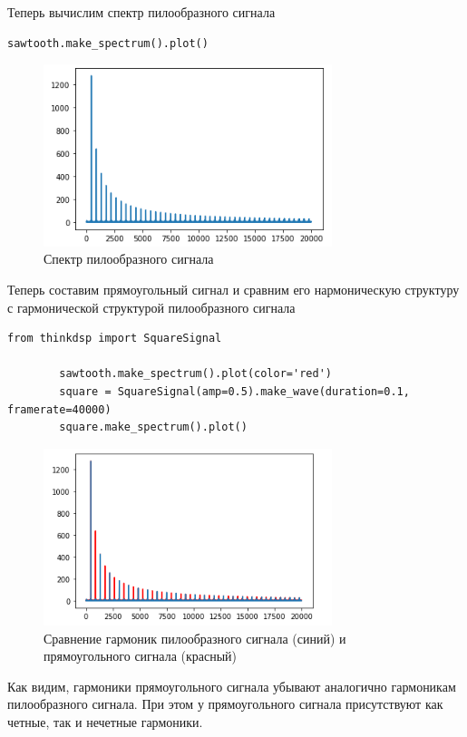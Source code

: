 \documentclass[a4paper,12pt]{article}
\begin{document}
\begin{enumerate}
	Теперь вычислим спектр пилообразного сигнала
	\begin{lstlisting}[caption=Спектр пилообразного сигнала]
		sawtooth.make_spectrum().plot()
	\end{lstlisting}
	\begin{figure}[H]
		\centering
		\includegraphics[width=0.75\textwidth]{2_2.png}
		\caption{Спектр пилообразного сигнала}
		\label{fig:2.2}
	\end{figure}
	
	
	Теперь составим прямоугольный сигнал и сравним его нармоническую структуру с гармонической структурой пилообразного сигнала
	\begin{lstlisting}[caption=Создание прямоугольного сигнала]
		from thinkdsp import SquareSignal
		
		sawtooth.make_spectrum().plot(color='red')
		square = SquareSignal(amp=0.5).make_wave(duration=0.1, framerate=40000)
		square.make_spectrum().plot()
	\end{lstlisting}
	\begin{figure}[H]
		\centering
		\includegraphics[width=0.75\textwidth]{2_3.png}
		\caption{Сравнение гармоник пилообразного сигнала (синий) и прямоугольного сигнала (красный)}
		\label{fig:2.3}
	\end{figure}
	
	Как видим, гармоники прямоугольного сигнала убывают аналогично гармоникам пилообразного сигнала. При этом у прямоугольного сигнала присутствуют как четные, так и нечетные гармоники.
	

\end{enumerate}
\end{document}
